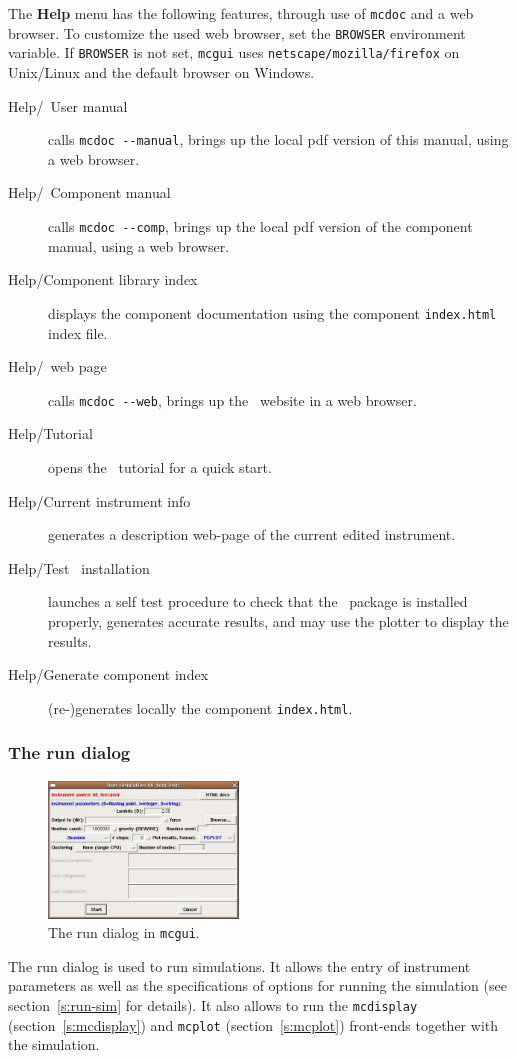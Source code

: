 \noindent The {\bf Help} menu has the following features, through use of
\verb+mcdoc+ and a web browser. To customize the used web browser, set
the \verb+BROWSER+ environment variable. If \verb+BROWSER+ is not set,
\verb+mcgui+ uses \verb+netscape/mozilla/firefox+ on Unix/Linux and the default browser on
Windows.
\begin{description}
\item[Help/\MCS\ User manual] calls \verb+mcdoc --manual+, brings up the local
  pdf version of this manual, using a web browser.
\item[Help/\MCS\ Component manual] calls \verb+mcdoc --comp+, brings up the local
  pdf version of the component manual, using a web browser.
\item[Help/Component library index] displays the component documentation using
  the component \verb+index.html+ index file.
\item[Help/\MCS\ web page] calls \verb+mcdoc --web+, brings up the \MCS\
  website in a web browser.
\item[Help/Tutorial] opens the \MCS\ tutorial for a quick start.
\item[Help/Current instrument info] generates a description web-page of the
  current edited instrument.
\item[Help/Test \MCS\ installation] launches a self test procedure to check that
  the \MCS\ package is installed properly, generates accurate results, and may
  use the plotter to display the results.
\item[Help/Generate component index] (re-)generates locally the component
  \verb+index.html+.
\end{description}


\subsubsection{The run dialog}

\begin{figure}[htb!]
  \begin{center}
    \includegraphics[width=0.45\textwidth]{figures/mcgui-run.eps}
  \end{center}
\caption{The run dialog in \texttt{mcgui}.}
\label{fig:mcgui-run}
\end{figure}
%
The run dialog is used to run simulations. It allows the entry of instrument
parameters as well as the specifications of options for running the simulation
(see section~\ref{s:run-sim} for details). It also allows to run the
\verb+mcdisplay+ (section~\ref{s:mcdisplay}) and \verb+mcplot+
(section~\ref{s:mcplot}) front-ends together with the
simulation.

